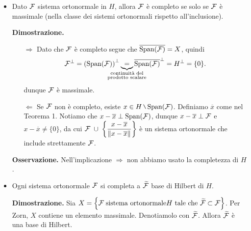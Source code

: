 \begin{itemize}
\newpage

\item Dato $\mathcal{F}$ sistema ortonormale in $H$, allora $\mathcal{F}$ è completo se solo se $\mathcal{F}$ è massimale (nella classe dei sistemi ortonormali rispetto all'inclusione).

\textbf{Dimostrazione.}
\begin{itemize}

\item[$\boxed{\Rightarrow}$] Dato che $\mathcal{F}$ è completo segue che $\overline{\operatorname{Span}(\mathcal{F})} = X$, quindi
%
$$
\mc{F}^{\perp} = \left( \spn(\mc{F}) \right)^\perp
\underbrace{=}_{\mathclap{\substack{\text{continuità del} \\ \text{prodotto scalare}}}} \overline{\spn(\mc{F})}^\perp = H^\perp = \{ 0 \}.
$$
%
dunque $\mathcal{F}$ è massimale.

\item[$\boxed{\Leftarrow}$] Se  $\mathcal{F}$ non è completo, esiste $x \in H \setminus \spn(\mc{F})$.
Definiamo $\overline{x}$ come nel Teorema 1. Notiamo che $x - \overline{x} \perp \operatorname{Span}(\mathcal{F})$, dunque $x - \overline{x} \perp \mathcal{F}$ e $x - \overline{x} \neq \{ 0 \}$, da cui $\displaystyle \mathcal{F} \; \cup \; \left\{ \frac{x - \overline{x}}{\left\lVert x - \overline{x} \right\rVert} \right\}$ è un sistema ortonormale che include strettamente $\mathcal{F}$. \absurd

\end{itemize}


\textbf{Osservazione.} Nell'implicazione $\boxed{\Rightarrow}$ non abbiamo usato la completezza di $H$.

\item Ogni sistema ortonormale $\mathcal{F}$ si completa a $\widetilde{\mathcal{F}}$ base di Hilbert di $H$.

\textbf{Dimostrazione.} Sia $X = \left\{ \mathcal{F} \; \text{sistema ortonormale} H \text{ tale che } \widetilde{\mathcal{F}} \subset \mathcal{F} \right\}$.
Per Zorn, $X$ contiene un elemento massimale. Denotiamolo con $\widetilde{\mathcal{F}}$. Allora $\widetilde{\mathcal{F}}$ è una base di Hilbert.


\end{itemize}




